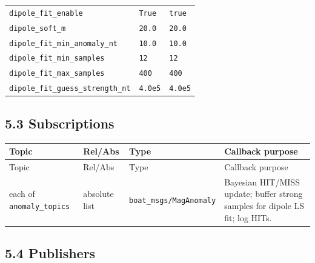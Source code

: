 \begin{center}
\begin{longtable}{@{}llp{7.2cm}@{}}
\texttt{dipole\_fit\_enable} & \texttt{True} & \texttt{true} \\
\texttt{dipole\_soft\_m} & \texttt{20.0} & \texttt{20.0} \\
\texttt{dipole\_fit\_min\_anomaly\_nt} & \texttt{10.0} & \texttt{10.0} \\
\texttt{dipole\_fit\_min\_samples} & \texttt{12} & \texttt{12} \\
\texttt{dipole\_fit\_max\_samples} & \texttt{400} & \texttt{400} \\
\texttt{dipole\_fit\_guess\_strength\_nt} & \texttt{4.0e5} & \texttt{4.0e5} \\
\bottomrule
\end{longtable}
\end{center}


\subsection{5.3 Subscriptions}


\begin{center}
\small
\begin{longtable}{@{}lllp{5.2cm}@{}}
\toprule
Topic & Rel/Abs & Type & Callback purpose \\
\midrule
\endfirsthead
\toprule
Topic & Rel/Abs & Type & Callback purpose \\
\midrule
\endhead
each of \texttt{anomaly\_topics} & absolute list & \texttt{boat\_msgs/MagAnomaly} & Bayesian HIT/MISS update; buffer strong samples for dipole LS fit; log HITs. \\
\bottomrule
\end{longtable}
\end{center}


\subsection{5.4 Publishers}


